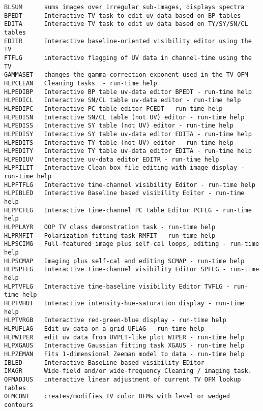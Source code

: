 
\vskip 0.5pt
\bbve\begin{verbatim}
BLSUM      sums images over irregular sub-images, displays spectra
BPEDT      Interactive TV task to edit uv data based on BP tables
EDITA      Interactive TV task to edit uv data based on TY/SY/SN/CL tables
EDITR      Interactive baseline-oriented visibility editor using the TV
FTFLG      interactive flagging of UV data in channel-time using the TV
GAMMASET   changes the gamma-correction exponent used in the TV OFM
HLPCLEAN   Cleaning tasks  - run-time help
HLPEDIBP   Interactive BP table uv-data editor BPEDT - run-time help
HLPEDICL   Interactive SN/CL table uv-data editor - run-time help
HLPEDIPC   Interactive PC table editor PCEDT - run-time help
HLPEDISN   Interactive SN/CL table (not UV) editor - run-time help
HLPEDISS   Interactive SY table (not UV) editor - run-time help
HLPEDISY   Interactive SY table uv-data editor EDITA - run-time help
HLPEDITS   Interactive TY table (not UV) editor - run-time help
HLPEDITY   Interactive TY table uv-data editor EDITA - run-time help
HLPEDIUV   Interactive uv-data editor EDITR - run-time help
HLPFILIT   Interactive Clean box file editing with image display - run-time help
HLPFTFLG   Interactive time-channel visibility Editor - run-time help
HLPIBLED   Interactive Baseline based visibility Editor - run-time help
HLPPCFLG   Interactive time-channel PC table Editor PCFLG - run-time help
HLPPLAYR   OOP TV class demonstration task - run-time help
HLPRMFIT   Polarization fitting task RMFIT - run-time help
HLPSCIMG   Full-featured image plus self-cal loops, editing - run-time help
HLPSCMAP   Imaging plus self-cal and editing SCMAP - run-time help
HLPSPFLG   Interactive time-channel visibility Editor SPFLG - run-time help
HLPTVFLG   Interactive time-baseline visibility Editor TVFLG - run-time help
HLPTVHUI   Interactive intensity-hue-saturation display - run-time help
HLPTVRGB   Interactive red-green-blue display - run-time help
HLPUFLAG   Edit uv-data on a grid UFLAG - run-time help
HLPWIPER   edit uv data from UVPLT-like plot WIPER - run-time help
HLPXGAUS   Interactive Gaussian fitting task XGAUS - run-time help
HLPZEMAN   Fits 1-dimensional Zeeman model to data - run-time help
IBLED      Interactive BaseLine based visibility EDitor
IMAGR      Wide-field and/or wide-frequency Cleaning / imaging task.
OFMADJUS   interactive linear adjustment of current TV OFM lookup tables
OFMCONT    creates/modifies TV color OFMs with level or wedged contours

\end{verbatim}
